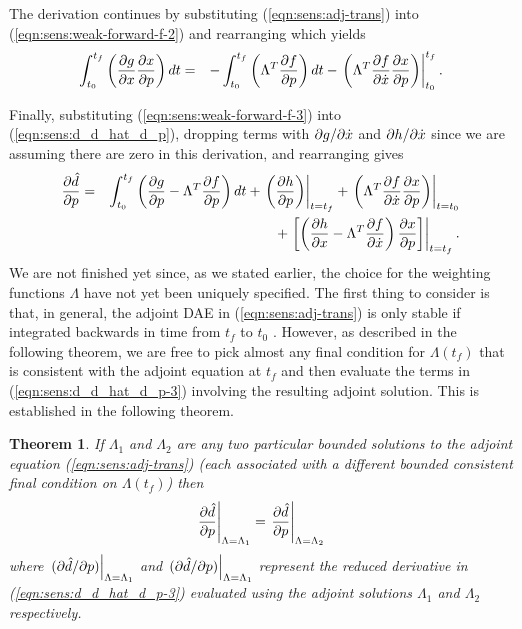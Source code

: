 \documentclass[pdf,ps2pdf,11pt]{SANDreport}
\newtheorem{theorem}{Theorem}
\begin{document}
The derivation continues by substituting
(\ref{eqn:sens:adj-trans}) into
(\ref{eqn:sens:weak-forward-f-2}) and rearranging which yields
%
\begin{eqnarray}
\int_{t_0}^{t_f} \left( \displaystyle{\frac{\partial g}{\partial x}} \displaystyle{\frac{\partial x}{\partial p}} \right) dt
& = & 
- \int_{t_0}^{t_f} \left( \Lambda^T \displaystyle{\frac{\partial f}{\partial p}} \right) dt
- \left. \left( \Lambda^T \displaystyle{\frac{\partial f}{\partial \dot{x}}} \displaystyle{\frac{\partial x}{\partial p}} \right) \right|^{t_f}_{t_0}.
\label{eqn:sens:weak-forward-f-3}
\end{eqnarray}

Finally, substituting (\ref{eqn:sens:weak-forward-f-3}) into
(\ref{eqn:sens:d_d_hat_d_p}), dropping terms with $\partial g / \partial \dot{x}$ and
$\partial h / \partial \dot{x}$ since we are assuming there are zero in this derivation,
and rearranging gives
%
\begin{eqnarray}
\displaystyle{\frac{\partial \hat{d}}{\partial p}} 
& = &
\int_{t_0}^{t_f} \left(\displaystyle{\frac{\partial g}{\partial p}} -  \Lambda^T \displaystyle{\frac{\partial f}{\partial p}} \right) dt
+ \left. \left( \displaystyle{\frac{\partial h}{\partial p}} \right) \right|_{t=t_f}
+ \left. \left( \Lambda^T \displaystyle{\frac{\partial f}{\partial \dot{x}}} \displaystyle{\frac{\partial x}{\partial p}} \right) \right|_{t=t_0}
\nonumber \\
& &
+ \left. \left[ \left(
    \displaystyle{\frac{\partial h}{\partial x}} - \Lambda^T \displaystyle{\frac{\partial f}{\partial \dot{x}}}
  \right)  \displaystyle{\frac{\partial x}{\partial p}} \right] \right|_{t=t_f}.
\label{eqn:sens:d_d_hat_d_p-3}
\end{eqnarray}
%
We are not finished yet since, as we stated earlier, the choice for the
weighting functions $\Lambda$ have not yet been uniquely specified.  The first
thing to consider is that, in general, the adjoint DAE in
(\ref{eqn:sens:adj-trans}) is only stable if integrated backwards
in time from $t_f$ to $t_0$ {}\cite{adjoint-sens-2003}.  However, as described
in the following theorem, we are free to pick almost any final condition for
$\Lambda(t_f)$ that is consistent with the adjoint equation at $t_f$ and then
evaluate the terms in (\ref{eqn:sens:d_d_hat_d_p-3}) involving
the resulting adjoint solution.  This is established in the following theorem.

\begin{theorem}
If $\Lambda_1$ and $\Lambda_2$ are any two particular bounded solutions to the
adjoint equation (\ref{eqn:sens:adj-trans}) (each associated with
a different bounded consistent final condition on $\Lambda(t_f)$) then
%
\begin{equation}
\left.\displaystyle{\frac{\partial \hat{d}}{\partial p}}\right|_{\Lambda=\Lambda_1} = \left.\displaystyle{\frac{\partial \hat{d}}{\partial p}}\right|_{\Lambda=\Lambda_2}
\label{eqn:sens:d_d_hat_d_p-same}
\end{equation}
%
where $\left.(\partial \hat{d} / \partial p)\right|_{\Lambda=\Lambda_1}$ and
$\left.(\partial \hat{d} / \partial p)\right|_{\Lambda=\Lambda_1}$ represent the reduced
derivative in (\ref{eqn:sens:d_d_hat_d_p-3}) evaluated using the
adjoint solutions $\Lambda_1$ and $\Lambda_2$ respectively.
\end{theorem}
\end{document}
